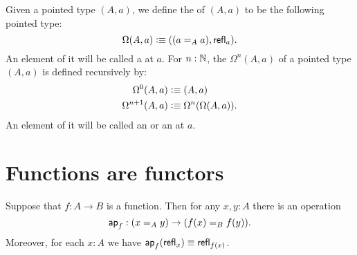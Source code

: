 \documentclass[hott-all.tex]{subfiles}
\begin{document}
\begin{defn} \label{def:loopspace}
  Given a pointed type $(A,a)$, we define the 
  of $(A,a)$ to be the following pointed type:
  \[\Omega(A,a)\defeq ((\id[A]aa),\refl a).\]
  An element of it will be called a  at $a$.
  For $n:\N$, the  $\Omega^{n}(A,a)$
  of a pointed type $(A,a)$ is defined recursively by:
  \begin{align*}
    \Omega^0(A,a)&\defeq(A,a)\\
    \Omega^{n+1}(A,a)&\defeq\Omega^n(\Omega(A,a)).
  \end{align*}
  An element of it will be called an 
  or an 
  at $a$.
\end{defn}
%

\section{Functions are functors}
\label{sec:functors}


\begin{lem}\label{lem:map}
  Suppose that $f:A\to B$ is a function.
  Then for any $x,y:A$ there is an operation
  \begin{equation*}
    \apfunc f : (\id[A] x y) \to (\id[B] {f(x)} {f(y)}).
  \end{equation*}
  Moreover, for each $x:A$ we have $\apfunc{f}(\refl{x})\jdeq \refl{f(x)}$.
\end{lem}
\end{document}

